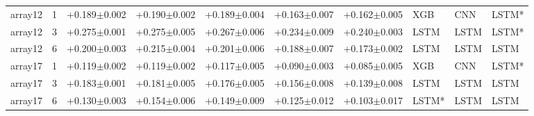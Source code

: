 \begin{table}[t]
\begin{tabular}{ll rrrrr lll}
    array12 & 1 & +0.189$\pm$0.002 & +0.190$\pm$0.002 & +0.189$\pm$0.004 & +0.163$\pm$0.007 & +0.162$\pm$0.005 & XGB & CNN & LSTM* \\
    array12 & 3 & +0.275$\pm$0.001 & +0.275$\pm$0.005 & +0.267$\pm$0.006 & +0.234$\pm$0.009 & +0.240$\pm$0.003 & LSTM & LSTM & LSTM* \\
    array12 & 6 & +0.200$\pm$0.003 & +0.215$\pm$0.004 & +0.201$\pm$0.006 & +0.188$\pm$0.007 & +0.173$\pm$0.002 & LSTM & LSTM & LSTM \\
    array17 & 1 & +0.119$\pm$0.002 & +0.119$\pm$0.002 & +0.117$\pm$0.005 & +0.090$\pm$0.003 & +0.085$\pm$0.005 & XGB & CNN & LSTM* \\
    array17 & 3 & +0.183$\pm$0.001 & +0.181$\pm$0.005 & +0.176$\pm$0.005 & +0.156$\pm$0.008 & +0.139$\pm$0.008 & LSTM & LSTM & LSTM \\
    array17 & 6 & +0.130$\pm$0.003 & +0.154$\pm$0.006 & +0.149$\pm$0.009 & +0.125$\pm$0.012 & +0.103$\pm$0.017 & LSTM* & LSTM & LSTM \\
    \bottomrule
  \end{tabular}
\end{table}
